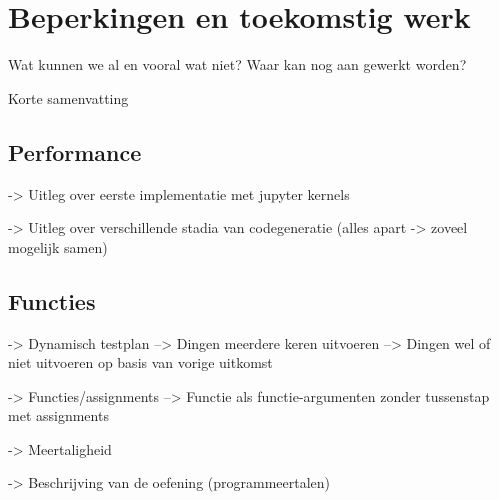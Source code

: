 \chapter{Beperkingen en toekomstig werk}\label{ch:beperkingen-en-toekomstig-werk}

Wat kunnen we al en vooral wat niet?
Waar kan nog aan gewerkt worden?

Korte samenvatting

\section{Performance}

-> Uitleg over eerste implementatie met jupyter kernels

-> Uitleg over verschillende stadia van codegeneratie (alles apart -> zoveel mogelijk samen)

\section{Functies}

-> Dynamisch testplan
--> Dingen meerdere keren uitvoeren
--> Dingen wel of niet uitvoeren op basis van vorige uitkomst


-> Functies/assignments
--> Functie als functie-argumenten zonder tussenstap met assignments

-> Meertaligheid

-> Beschrijving van de oefening (programmeertalen)
